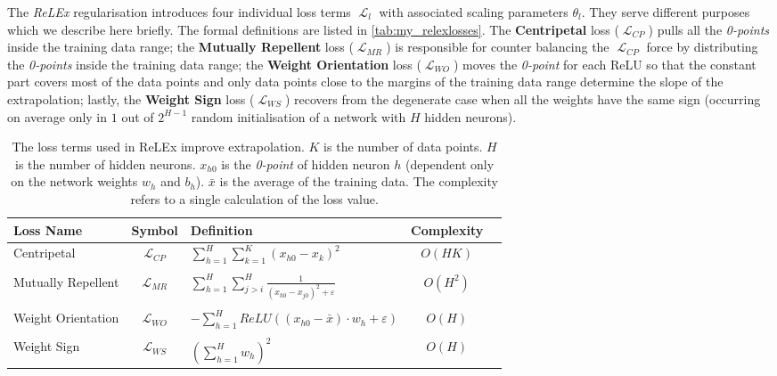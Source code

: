\documentclass[runningheads]{llncs}
\DeclareMathOperator{\Lagr}{\mathcal{L}}
\begin{document}
The \emph{ReLEx} regularisation introduces four individual loss terms $\Lagr_l$ with associated scaling parameters $\theta_l$. 
They serve different purposes which we describe here briefly. 
The formal definitions are listed in \autoref{tab:my_relexlosses}.
The \textbf{Centripetal} loss ($\Lagr_{CP}$) pulls all the \emph{0-points} inside the training data range; the 
\textbf{Mutually Repellent} loss ($\Lagr_{MR}$) is responsible for counter balancing the $\Lagr_{CP}$ force by distributing the \emph{0-points} inside the training data range; 
the \textbf{Weight Orientation} loss ($\Lagr_{WO}$) moves the \emph{0-point} for each ReLU so that the constant part covers most of the data points and only data points close to the margins of the training data range determine the slope of the extrapolation; 
lastly, the \textbf{Weight Sign} loss ($\Lagr_{WS}$) recovers from the degenerate case when all the weights have the same sign (occurring on average only in $1$ out of $2^{H-1}$ random initialisation of a network with $H$ hidden neurons).

\begin{table}[t!]
 \centering
 \begin{tabular}{lclcc} \hline
 Loss Name & Symbol & Definition & Complexity \\
 \hline \hline
 Centripetal & $\Lagr_{CP}$ & $\sum_{h=1}^H \sum_{k=1}^K (x_{h0} - x_{k})^2$ & $O(H K)$ \\
 \hfill
 \\
 Mutually Repellent & $\Lagr_{MR}$ & $\sum_{h=1}^H \sum_{j>i}^H \frac{1}{(x_{h0} - x_{j0})^2+ \varepsilon}$ & $O(H^2)$ \\ 
 \hfill
 \\
 Weight Orientation & $\Lagr_{WO} $ & $- \sum_{h=1}^H {ReLU((x_{h0} - \bar{x})\cdot w_h + \varepsilon)}$ & $O(H)$ \\
 \hfill
 \\
 Weight Sign & $\Lagr_{WS} $ & $({\sum_{h=1}^Hw_h})^2$ & $O(H)$ 
 \\
 \hline
\end{tabular}

\caption{The loss terms used in ReLEx improve extrapolation. 
$K$ is the number of data points.
$H$ is the number of hidden neurons. 
$x_{h0}$ is the \emph{0-point} of hidden neuron $h$ (dependent only on the network weights $w_h$ and $b_h$).
$\bar{x}$ is the average of the training data. 
The complexity refers to a single calculation of the loss value. 
}
\label{tab:my_relexlosses}
 
\end{table}
\end{document}
